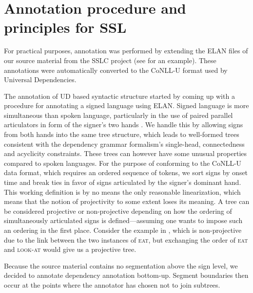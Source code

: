 \documentclass[11pt]{article}
\begin{document}
\section{Annotation procedure and principles for SSL}

For practical purposes, annotation was performed by extending the ELAN
files of our source material from the SSLC project (see
 for an example). These annotations were automatically
converted to the CoNLL-U format used by Universal Dependencies.

The annotation of UD based syntactic structure started by coming up with a procedure for annotating a signed language using ELAN. Signed language is more simultaneous than spoken language, particularly in the use of paired parallel articulators in form of the signer's two hands \cite{Vermeerbergen2007simultaneity}.
We handle this by allowing signs from both hands into the same tree structure,
which leads to well-formed trees consistent with the dependency grammar
formalism's single-head, connectedness and acyclicity constraints.
These trees can however have some unusual properties compared to spoken
languages.
For the purpose of conforming to the CoNLL-U data format,
which requires an ordered sequence of tokens, we sort
signs by onset time and break ties in favor of signs articulated by the
signer's dominant hand.
This working definition is by no means the only reasonable linearization,
which means that the notion of projectivity to some extent loses its meaning.
A tree can be considered projective or non-projective depending on how the
ordering of simultaneously articulated signs is defined---assuming one wants
to impose such an ordering in the first place.
Consider the example in , which is non-projective
due to the link between the two instances of \textsc{eat},
but exchanging the order of \textsc{eat} and \textsc{look-at} would
give us a projective tree.

Because the source material contains no segmentation above the sign level,
we decided to annotate dependency annotation bottom-up. Segment boundaries
then occur at the points where the annotator has chosen not to join subtrees.
\end{document}
